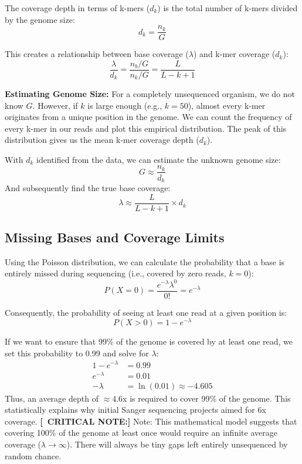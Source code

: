 \documentclass[11pt,a4paper]{article}
\newcommand{\sta}{\textbf{[\textasteriskcentered\ CRITICAL NOTE:] }}
\begin{document}
The coverage depth in terms of k-mers ($d_k$) is the total number of k-mers divided by the genome size:
\[ d_k = \frac{n_k}{G} \]

This creates a relationship between base coverage ($\lambda$) and k-mer coverage ($d_k$):
\[ \frac{\lambda}{d_k} = \frac{n_b / G}{n_k / G} = \frac{L}{L - k + 1} \]

\textbf{Estimating Genome Size:} 
For a completely unsequenced organism, we do not know $G$. However, if $k$ is large enough (e.g., $k=50$), almost every k-mer originates from a unique position in the genome. We can count the frequency of every k-mer in our reads and plot this empirical distribution. The peak of this distribution gives us the mean k-mer coverage depth ($d_k$). 

With $d_k$ identified from the data, we can estimate the unknown genome size:
\[ G \approx \frac{n_k}{d_k} \]
And subsequently find the true base coverage:
\[ \lambda \approx \frac{L}{L - k + 1} \times d_k \]

\subsection{Missing Bases and Coverage Limits}

Using the Poisson distribution, we can calculate the probability that a base is entirely missed during sequencing (i.e., covered by zero reads, $k=0$):
\[ P(X = 0) = \frac{e^{-\lambda} \lambda^0}{0!} = e^{-\lambda} \]

Consequently, the probability of seeing at least one read at a given position is:
\[ P(X > 0) = 1 - e^{-\lambda} \]

If we want to ensure that 99\% of the genome is covered by at least one read, we set this probability to 0.99 and solve for $\lambda$:
\begin{align*}
1 - e^{-\lambda} &= 0.99 \\
e^{-\lambda} &= 0.01 \\
-\lambda &= \ln(0.01) \approx -4.605
\end{align*}
Thus, an average depth of $\approx 4.6$x is required to cover 99\% of the genome. This statistically explains why initial Sanger sequencing projects aimed for 6x coverage.
\sta Note: This mathematical model suggests that covering 100\% of the genome at least once would require an infinite average coverage ($\lambda \to \infty$). There will always be tiny gaps left entirely unsequenced by random chance.
\end{document}
